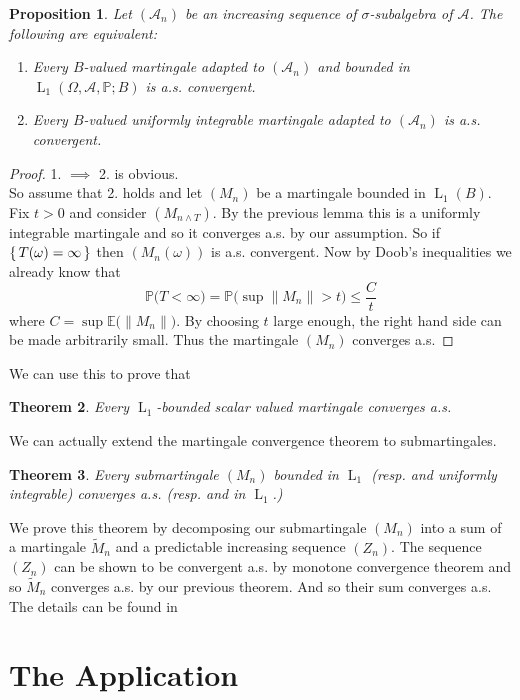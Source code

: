 \documentclass[]{report}
\newcommand{\lp}[2]{\operatorname{L}_{#1}({#2})}
\newcommand*{\Normu}[1]{\lVert {#1} \rVert}
\newcommand*{\ext}[1]{\mathbb{E}\big({#1}\big)}
\renewcommand{\P}[1]{\mathbb{P}\big({#1}\big)}
\newcommand{\pspc}{\Omega,\mathcal{A},\mathbb{P}}
\newtheorem{theorem}{Theorem}[chapter]
\newtheorem{prop}[theorem]{Proposition}
\begin{document}
\begin{prop}\label{uniform}
	Let $(\mathcal{A}_n)$ be an increasing sequence of $\sigma$-subalgebra of $\mathcal{A}$. The following are equivalent:
	\begin{enumerate}
		\item Every $B$-valued martingale adapted to $(\mathcal{A}_n)$ and bounded in $\lp{1}{\pspc;B}$ is a.s. convergent.
		\item Every $B$-valued uniformly integrable martingale adapted to $(\mathcal{A}_n)$  is a.s. convergent.
	\end{enumerate}
\end{prop}
\begin{proof}
	1. $\implies$ 2. is obvious.\\
	So assume that 2. holds and let $(M_n)$ be a martingale bounded in $\lp{1}{B}$. Fix $t>0$ and consider $(M_{n\wedge T})$. By the previous lemma this is a uniformly integrable martingale and so it converges a.s. by our assumption. So if $\set{T(\omega)=\infty}$ then $(M_n(\omega))$ is a.s. convergent. Now by Doob's inequalities we already know that 
	\[ \P{T< \infty}=\P{\sup \Normu{M_n}>t}\leq \frac{C}{t} \] where $C=\sup \ext{\Normu{M_n}}$. By choosing $t$ large enough, the right hand side can be made arbitrarily small. Thus the martingale $(M_n)$ converges a.s.
\end{proof}

We can use this to prove that 
\begin{theorem}
	Every $\operatorname{L}_1$-bounded scalar valued martingale converges a.s.
\end{theorem}

We can actually extend the martingale convergence theorem to submartingales.

\begin{theorem}\label{sub}
	Every submartingale $(M_n)$ bounded in $\operatorname{L}_1$ (resp. and uniformly integrable) converges a.s. (resp. and in $\operatorname{L}_1$.)
\end{theorem}
We prove this theorem by decomposing our submartingale $(M_n)$ into a sum of a martingale $\tilde{M}_n$ and a predictable increasing sequence $(Z_n)$. The sequence $(Z_n)$ can be shown to be convergent a.s. by monotone convergence theorem and so $\tilde{M}_n$ converges a.s. by our previous theorem. And so their sum converges a.s. The details can be found in \cite{pis}



\chapter{The Application}
\end{document}
